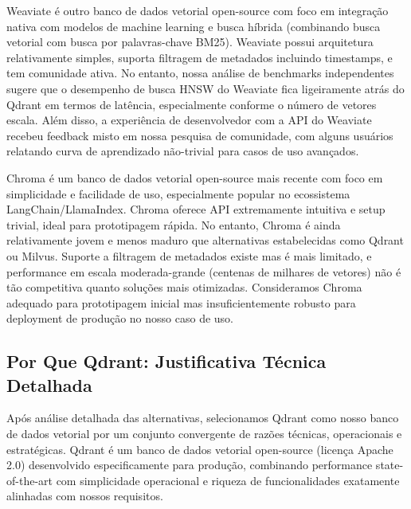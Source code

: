 \documentclass[12pt,a4paper]{article}
\begin{document}
Weaviate é outro banco de dados vetorial open-source com foco em integração nativa com modelos de machine learning e busca híbrida (combinando busca vetorial com busca por palavras-chave BM25). Weaviate possui arquitetura relativamente simples, suporta filtragem de metadados incluindo timestamps, e tem comunidade ativa. No entanto, nossa análise de benchmarks independentes sugere que o desempenho de busca HNSW do Weaviate fica ligeiramente atrás do Qdrant em termos de latência, especialmente conforme o número de vetores escala. Além disso, a experiência de desenvolvedor com a API do Weaviate recebeu feedback misto em nossa pesquisa de comunidade, com alguns usuários relatando curva de aprendizado não-trivial para casos de uso avançados.

Chroma é um banco de dados vetorial open-source mais recente com foco em simplicidade e facilidade de uso, especialmente popular no ecossistema LangChain/LlamaIndex. Chroma oferece API extremamente intuitiva e setup trivial, ideal para prototipagem rápida. No entanto, Chroma é ainda relativamente jovem e menos maduro que alternativas estabelecidas como Qdrant ou Milvus. Suporte a filtragem de metadados existe mas é mais limitado, e performance em escala moderada-grande (centenas de milhares de vetores) não é tão competitiva quanto soluções mais otimizadas. Consideramos Chroma adequado para prototipagem inicial mas insuficientemente robusto para deployment de produção no nosso caso de uso.

\subsection{Por Que Qdrant: Justificativa Técnica Detalhada}

Após análise detalhada das alternativas, selecionamos Qdrant como nosso banco de dados vetorial por um conjunto convergente de razões técnicas, operacionais e estratégicas. Qdrant é um banco de dados vetorial open-source (licença Apache 2.0) desenvolvido especificamente para produção, combinando performance state-of-the-art com simplicidade operacional e riqueza de funcionalidades exatamente alinhadas com nossos requisitos.
\end{document}
